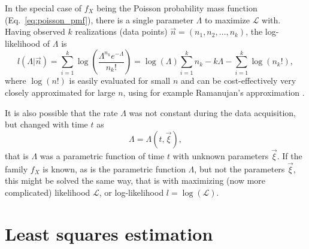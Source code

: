 In the special case of $f_X$ being the Poisson probability mass function (Eq.~\ref{eq:poisson_pmf}), there is a single parameter $\Lambda$ to maximize $\mathcal{L}$ with. Having observed $k$ realizations (data points) $\vec{n} = (n_1, n_2, \dots , n_k)$, the log-likelihood of $\Lambda$ is
\begin{equation}
    l(\Lambda|\vec{n}) = \sum_{i=1}^k \log \left( \frac{\Lambda^{n_k} e^{-\Lambda}}{n_k!} \right) = \log(\Lambda) \sum_{i=1}^k n_k - k \Lambda - \sum_{i=1}^k \log(n_k!),  
\end{equation}
where $\log(n!)$ is easily evaluated for small $n$ and can be cost-effectively very closely approximated for large $n$, using for example Ramanujan's approximation \citep{ramanujan1988lost}. 

It is also possible that the rate $\Lambda$ was not constant during the data acquisition, but changed with time $t$ as
\begin{equation}
    \Lambda = \Lambda(t,\vec{\xi}), \label{eq:compound_model}
\end{equation}
that is $\Lambda$ was a parametric function of time $t$ with unknown parameters $\vec{\xi}$. If the family $f_X$ is known, as is the parametric function $\Lambda$, but not the parameters $\vec{\xi}$, this might be solved the same way, that is with maximizing (now more complicated) likelihood $\mathcal{L}$, or log-likelihood $l = \log(\mathcal{L})$. 

\section{Least squares estimation}

